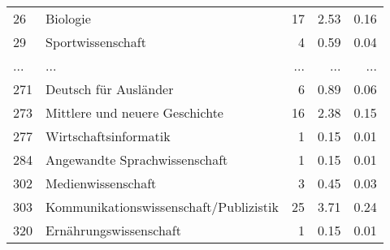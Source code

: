 \begin{longtable}{lXrrr}
        26 & \multicolumn{1}{X}{Biologie} & %
          \num{17} &
          \num[round-mode=places,round-precision=2]{2.53} &
          \num[round-mode=places,round-precision=2]{0.16} \\
        29 & \multicolumn{1}{X}{Sportwissenschaft} & %
          \num{4} &
          \num[round-mode=places,round-precision=2]{0.59} &
          \num[round-mode=places,round-precision=2]{0.04} \\
       ... & ... & ... & ... & ... \\
        271 & \multicolumn{1}{X}{Deutsch für Ausländer} & %
          \num{6} &
          \num[round-mode=places,round-precision=2]{0.89} &
          \num[round-mode=places,round-precision=2]{0.06} \\

        273 & \multicolumn{1}{X}{Mittlere und neuere Geschichte} & %
          \num{16} &
          \num[round-mode=places,round-precision=2]{2.38} &
          \num[round-mode=places,round-precision=2]{0.15} \\

        277 & \multicolumn{1}{X}{Wirtschaftsinformatik} & %
          \num{1} &
          \num[round-mode=places,round-precision=2]{0.15} &
          \num[round-mode=places,round-precision=2]{0.01} \\

        284 & \multicolumn{1}{X}{Angewandte Sprachwissenschaft} & %
          \num{1} &
          \num[round-mode=places,round-precision=2]{0.15} &
          \num[round-mode=places,round-precision=2]{0.01} \\

        302 & \multicolumn{1}{X}{Medienwissenschaft} & %
          \num{3} &
          \num[round-mode=places,round-precision=2]{0.45} &
          \num[round-mode=places,round-precision=2]{0.03} \\

        303 & \multicolumn{1}{X}{Kommunikationswissenschaft/Publizistik} & %
          \num{25} &
          \num[round-mode=places,round-precision=2]{3.71} &
          \num[round-mode=places,round-precision=2]{0.24} \\

        320 & \multicolumn{1}{X}{Ernährungswissenschaft} & %
          \num{1} &
          \num[round-mode=places,round-precision=2]{0.15} &
          \num[round-mode=places,round-precision=2]{0.01} \\


\end{longtable}
